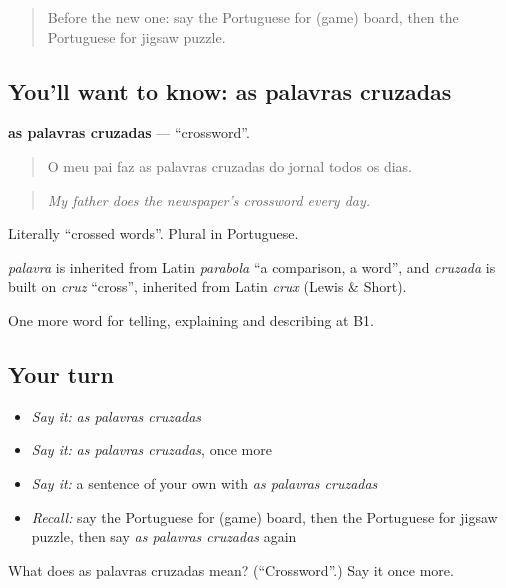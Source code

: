 \label{lesson:PT-C503-palavras-cruzadas}



\begin{quote}
Before the new one: say the Portuguese for (game) board, then the Portuguese for jigsaw puzzle.
\end{quote}

\subsection*{You'll want to know: as palavras cruzadas}
\textbf{as palavras cruzadas} — \textquotedblleft{}crossword\textquotedblright{}.

\begin{quote}
O meu pai faz as palavras cruzadas do jornal todos os dias.
\end{quote}

\begin{quote}
\emph{My father does the newspaper's crossword every day.}
\end{quote}

Literally \textquotedblleft{}crossed words\textquotedblright{}. Plural in Portuguese.

\begin{cousinweb}
\emph{palavra} is inherited from Latin \emph{parabola} \textquotedblleft{}a comparison, a word\textquotedblright{}, and \emph{cruzada} is built on \emph{cruz} \textquotedblleft{}cross\textquotedblright{}, inherited from Latin \emph{crux} (Lewis \& Short).
\end{cousinweb}

\begin{grammarlens}[title={What you've built}]
One more word for telling, explaining and describing at B1.
\end{grammarlens}

\subsection*{Your turn}
\begin{itemize}
\raggedright
  \item \emph{Say it:} \emph{as palavras cruzadas}
  \item \emph{Say it:} \emph{as palavras cruzadas}, once more
  \item \emph{Say it:} a sentence of your own with \emph{as palavras cruzadas}
  \item \emph{Recall:} say the Portuguese for (game) board, then the Portuguese for jigsaw puzzle, then say \emph{as palavras cruzadas} again
\end{itemize}

\begin{tcolorbox}[breakable,colback=teal!4,colframe=teal!35!black,title={Before you move on}]
What does as palavras cruzadas mean? (\textquotedblleft{}Crossword\textquotedblright{}.) Say it once more.
\end{tcolorbox}
